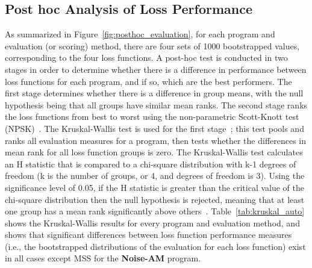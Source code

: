 \documentclass[lettersize,journal]{IEEEtran}
\providecommand{\gls}[1]{#1}
\newcommand{\AmpMod}{\textbf{Noise-AM}}
\begin{document}
\subsection{Post hoc Analysis of Loss Performance}
\label{sec:results_posthoc}
As summarized in Figure~\ref{fig:posthoc_evaluation}, for each program and evaluation (or scoring) method, there are four sets of 1000 bootstrapped values, corresponding to the four loss functions. A post-hoc test is conducted in two stages in order to determine whether there is a difference in performance between loss functions for each program, and if so, which are the best performers. The first stage determines whether there is a difference in group means, with the null hypothesis being that all groups have similar mean ranks. The second stage ranks the loss functions from best to worst using the non-parametric Scott-Knott test (\gls{NPSK})~\cite{tantithamthavorn2017mvt,tantithamthavorn2018optimization}.
The Kruskal-Wallis test is used for the first stage~\cite{kruskal1952use}; this test pools and ranks all evaluation measures for a program, then tests whether the differences in mean rank for all loss function groups is zero. The Kruskal-Wallis test calculates an H statistic that is compared to a chi-square distribution with k-1 degrees of freedom (k is the number of groups, or 4, and degrees of freedom is 3). Using the significance level of 0.05, if the H statistic is greater than the critical value of the chi-square distribution then the null hypothesis is rejected, meaning that at least one group has a mean rank significantly above others~\cite{kruskal1952use}. Table~\ref{tab:kruskal_auto} shows the Kruskal-Wallis results for every program and evaluation method, and shows that significant differences between loss function performance measures (i.e., the bootstrapped distributions of the evaluation for each loss function) exist in all cases except MSS for the \AmpMod{} program. 
\end{document}
